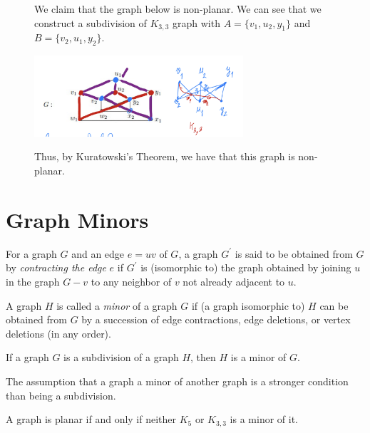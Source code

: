 \begin{figure}[ht]
\begin{nexample}
  We claim that the graph below is non-planar. We can see that we
  construct a subdivision of \(K_{3, 3}\) graph with \(A = \{v_1,
  u_2, y_1\}\) and \(B = \{v_2, u_1, y_2\}\).

  \begin{center}
    \includegraphics[width=0.69\textwidth]{figures/l13/non-planar-example}
  \end{center}

  Thus, by Kuratowski's Theorem, we have that this graph is
  non-planar.
\end{nexample}
\end{figure}

\section{Graph Minors}

\begin{definition}
  For a graph \(G\) and an edge \(e=u v\) of \(G\), a graph 
  \(G^{\prime}\) is said to be obtained from \(G\) by
  \textit{contracting the edge} \(e\) if \(G^{\prime}\) is
  (isomorphic to) the graph
  obtained by joining \(u\) in the graph \(G-v\) to any neighbor
  of \(v\) not already adjacent to \(u\).
\end{definition}

\begin{definition}
  A graph \(H\) is called a \textit{minor} of a graph \(G\) if
  (a graph isomorphic to) \(H\) can be obtained from \(G\) by a
  succession of edge contractions, edge deletions, or vertex
  deletions (in any order). 
\end{definition}

\begin{theorem}
  If a graph \(G\) is a subdivision of a graph \(H\), then \(H\)
  is a minor of \(G\).
\end{theorem}

\begin{remark}
  The assumption that a graph a minor of another graph is a
  stronger condition than being a subdivision.
\end{remark}

\begin{theorem}
  A graph is planar if and only if neither \(K_5\) or
  \(K_{3, 3}\) is a minor of it.
\end{theorem}

